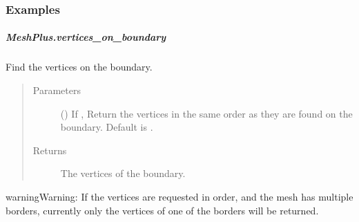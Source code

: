 \documentclass[letterpaper,10pt,english]{sphinxmanual}
\begin{document}
\begin{fulllineitems}
\begin{fulllineitems}
\begin{quote}
\begin{description}
\end{description}\end{quote}
\subsubsection*{Examples}

\begin{sphinxVerbatim}[commandchars=\\\{\}]
\end{sphinxVerbatim}

\end{fulllineitems}



\subparagraph{MeshPlus.vertices\_on\_boundary}
\label{\detokenize{api/generated/directional_clustering.mesh.MeshPlus.vertices_on_boundary:meshplus-vertices-on-boundary}}\label{\detokenize{api/generated/directional_clustering.mesh.MeshPlus.vertices_on_boundary::doc}}

\begin{fulllineitems}
\label{\detokenize{api/generated/directional_clustering.mesh.MeshPlus.vertices_on_boundary:directional_clustering.mesh.MeshPlus.vertices_on_boundary}}
Find the vertices on the boundary.
\begin{quote}\begin{description}
\item[{Parameters}] \leavevmode
{} () \textendash{} If , Return the vertices in the same order as they are found on the boundary.
Default is .

\item[{Returns}] \leavevmode
{} \textendash{} The vertices of the boundary.

\end{description}\end{quote}

\begin{sphinxadmonition}{warning}{Warning:}
If the vertices are requested in order, and the mesh has multiple borders,
currently only the vertices of one of the borders will be returned.
\end{sphinxadmonition}

\end{fulllineitems}
\end{fulllineitems}
\end{document}
